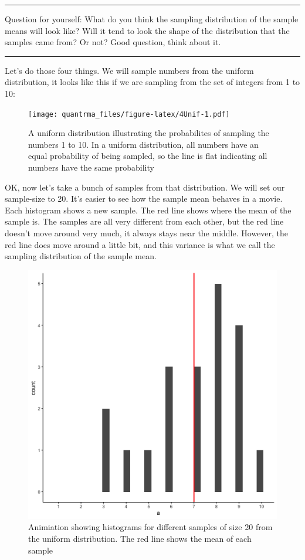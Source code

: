 \documentclass[
]{book}
\begin{document}
\begin{center}\rule{0.5\linewidth}{0.5pt}\end{center}

Question for yourself: What do you think the sampling distribution of the sample means will look like? Will it tend to look the shape of the distribution that the samples came from? Or not? Good question, think about it.

\begin{center}\rule{0.5\linewidth}{0.5pt}\end{center}

Let's do those four things. We will sample numbers from the uniform distribution, it looks like this if we are sampling from the set of integers from 1 to 10:

\begin{figure}
\centering
\texttt{[image: quantrma\_files/figure-latex/4Unif-1.pdf]}
\caption{\label{fig:4Unif}A uniform distribution illustrating the probabilites of sampling the numbers 1 to 10. In a uniform distribution, all numbers have an equal probability of being sampled, so the line is flat indicating all numbers have the same probability}
\end{figure}

OK, now let's take a bunch of samples from that distribution. We will set our sample-size to 20. It's easier to see how the sample mean behaves in a movie. Each histogram shows a new sample. The red line shows where the mean of the sample is. The samples are all very different from each other, but the red line doesn't move around very much, it always stays near the middle. However, the red line does move around a little bit, and this variance is what we call the sampling distribution of the sample mean.

\begin{figure}
\centering
\includegraphics{gifs/sampleHistUnif-1.gif}
\caption{\label{fig:4sample20unif}Animiation showing histograms for different samples of size 20 from the uniform distribution. The red line shows the mean of each sample}
\end{figure}
\end{document}
